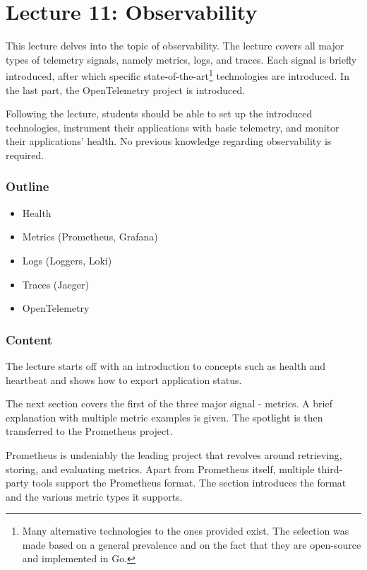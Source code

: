 \documentclass[
  digital,
  color,
  oneside,
  nosansbold,
  nocolorbold,
  nolof,
  nolot,
]{fithesis4}
\begin{document}
\section{Lecture 11: Observability}\label{lecture-observability}

This lecture delves into the topic of observability. The lecture covers all major types of telemetry signals, namely metrics, logs, and traces. Each signal is briefly introduced, after which specific state-of-the-art\footnote{Many alternative technologies to the ones provided exist. The selection was made based on a general prevalence and on the fact that they are open-source and implemented in Go.}
technologies are introduced. In the last part, the OpenTelemetry\cite{open-telemetry} project is introduced.

Following the lecture, students should be able to set up the introduced technologies, instrument their applications with basic telemetry, and monitor their applications' health. No previous knowledge regarding observability is required.

\subsubsection{Outline}

\begin{itemize}
    \item Health
    \item Metrics (Prometheus, Grafana)
    \item Logs (Loggers, Loki)
    \item Traces (Jaeger)
    \item OpenTelemetry
\end{itemize}

\subsubsection{Content}

The lecture starts off with an introduction to concepts such as health and heartbeat and shows how to export application status.

The next section covers the first of the three major signal - metrics. A brief explanation with multiple metric examples is given. The spotlight is then transferred to the Prometheus project.

Prometheus\cite{prometheus} is undeniably the leading project that revolves around retrieving, storing, and evaluating metrics. Apart from Prometheus itself, multiple third-party tools support the Prometheus format. The section introduces the format and the various metric types it supports.
\end{document}
